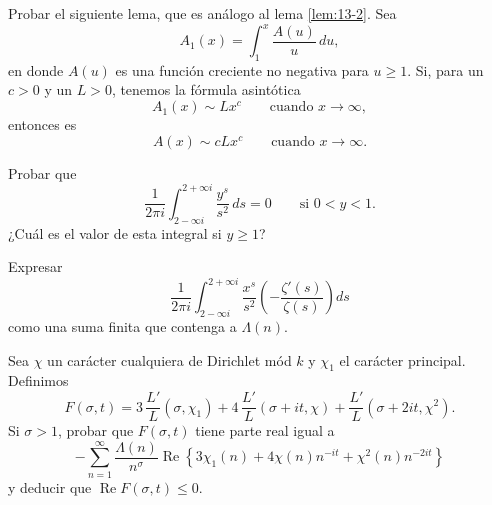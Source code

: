 \documentclass[12pt,a4paper]{book}
\begin{document}
    \begin{ejercicio}
        Probar el siguiente lema, que es análogo al lema \ref{lem:13-2}. Sea
        \begin{equation*}
            A_{1}(x)=\int_{1}^{x}\frac{A(u)}{u}\,du,
        \end{equation*}
        en donde $A(u)$ es una función creciente no negativa para $u\geq1$. Si, para un $c>0$ y
        un $L>0$, tenemos la fórmula asintótica
        \begin{equation*}
            A_{1}(x)\sim Lx^{c}\qquad\text{cuando }x\to\infty,
        \end{equation*}
        entonces es
        \begin{equation*}
            A(x)\sim cLx^{c}\qquad\text{cuando }x\to\infty.
        \end{equation*}
    \end{ejercicio}

    \begin{ejercicio}
        Probar que
        \begin{equation*}
            \frac{1}{2\pi i}\int_{2-\infty i}^{2+\infty i}\frac{y^{s}}{s^{2}}\,ds=0\qquad\text{si }0<y<1.
        \end{equation*}
        ¿Cuál es el valor de esta integral si $y\geq1$?
    \end{ejercicio}

    \begin{ejercicio}
        Expresar
        \begin{equation*}
            \frac{1}{2\pi i}\int_{2-\infty i}^{2+\infty i}\frac{x^{s}}{s^{2}}\left(-\frac{\zeta'(s)}{\zeta(s)}\right)ds
        \end{equation*}
        como una suma finita que contenga a $\Lambda(n)$.
    \end{ejercicio}

    \begin{ejercicio}
        Sea $\chi$ un carácter cualquiera de Dirichlet mód $k$ y $\chi_{1}$ el carácter principal.
        Definimos
        \begin{equation*}
            F(\sigma,t)=3\,\frac{L'}{L}(\sigma,\chi_{1})+4\,\frac{L'}{L}(\sigma+it,\chi)+\frac{L'}{L}(\sigma+2it,\chi^{2}).
        \end{equation*}
        Si $\sigma>1$, probar que $F(\sigma,t)$ tiene parte real igual a
        \begin{equation*}
            -\sum_{n=1}^{\infty}\frac{\Lambda(n)}{n^{\sigma}}\operatorname{Re}\left\{3\chi_{1}(n)+4\chi(n)n^{-it}+\chi^{2}(n)n^{-2it}\right\}
        \end{equation*}
        y deducir que $\operatorname{Re}F(\sigma,t)\leq0$.
    \end{ejercicio}
\end{document}
